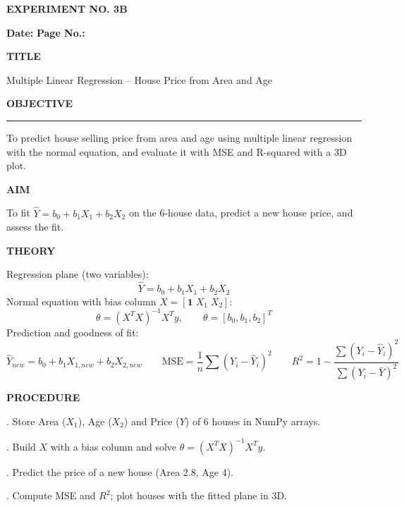 \documentclass[11pt,twoside]{article}
\newcommand{\expheading}[1]{{\fontsize{14}{17}\selectfont\textbf{#1}\par}}
\newcommand{\fullrule}{\noindent\rule{\textwidth}{0.6pt}\par}
\begin{document}
{\setlength{\parskip}{1pt}\setlength{\abovedisplayskip}{2pt}\setlength{\belowdisplayskip}{2pt}
\begin{center}
\expheading{EXPERIMENT NO. 3B}
\end{center}
\vspace{2pt}

\noindent\textbf{Date:} \underline{\hspace{2.6cm}} \hfill \textbf{Page No.:} \underline{\hspace{2.6cm}}\par
\vspace{6pt}

\expheading{TITLE}
\vspace{4pt}
\noindent Multiple Linear Regression -- House Price from Area and Age\par
\vspace{4pt}

\expheading{OBJECTIVE}
\vspace{2pt}
\fullrule
\vspace{4pt}
\noindent To predict house selling price from area and age using multiple linear regression with the normal equation, and evaluate it with MSE and R-squared with a 3D plot. \par
\vspace{4pt}

\expheading{AIM}
\vspace{4pt}
\noindent To fit $\hat{Y}=b_0+b_1X_1+b_2X_2$ on the 6-house data, predict a new house price, and assess the fit. \par
\vspace{4pt}

\expheading{THEORY}
\vspace{4pt}
Regression plane (two variables):
\[\hat{Y}=b_0+b_1X_1+b_2X_2\]
Normal equation with bias column $X=[\mathbf{1}\;X_1\;X_2]$:
\[\theta=(X^TX)^{-1}X^Ty,\qquad \theta=[b_0,b_1,b_2]^T\]
Prediction and goodness of fit:
\[\hat{Y}_{new}=b_0+b_1X_{1,new}+b_2X_{2,new}\qquad \mathrm{MSE}=\frac{1}{n}\sum(Y_i-\hat{Y}_i)^2\qquad R^2=1-\frac{\sum(Y_i-\hat{Y}_i)^2}{\sum(Y_i-\bar{Y})^2}\]
\vspace{4pt}

\expheading{PROCEDURE}
\vspace{4pt}
. Store Area ($X_1$), Age ($X_2$) and Price ($Y$) of 6 houses in NumPy arrays.\par
{}. Build $X$ with a bias column and solve $\theta=(X^TX)^{-1}X^Ty$.\par
{}. Predict the price of a new house (Area 2.8, Age 4).\par
{}. Compute MSE and $R^2$; plot houses with the fitted plane in 3D. \par
\vspace{4pt}

}
\end{document}
